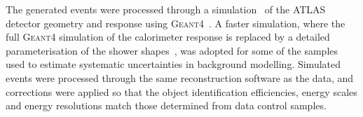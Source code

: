 \documentclass[PAPER, coverpage, atlasdraft=true, texlive=2016, UKenglish]{\ATLASLATEXPATH atlasdoc}
\providecommand{\DIFaddend}{} %
\begin{document}
\DIFaddend The generated events were processed through a simulation~\cite{Aad:2010ah} of the ATLAS detector geometry and response 
using \textsc{Geant4}~\cite{Agostinelli:2002hh}. A faster simulation, where the full \textsc{Geant4} simulation of
the calorimeter response is replaced by a detailed parameterisation of the shower shapes~\cite{FastCaloSim},
was adopted for some of the samples used to estimate systematic uncertainties in background modelling.
Simulated events were processed through the same reconstruction software as the data, and corrections were applied so that the object identification 
efficiencies, energy scales and energy resolutions match those determined from data control samples.


\end{document}
